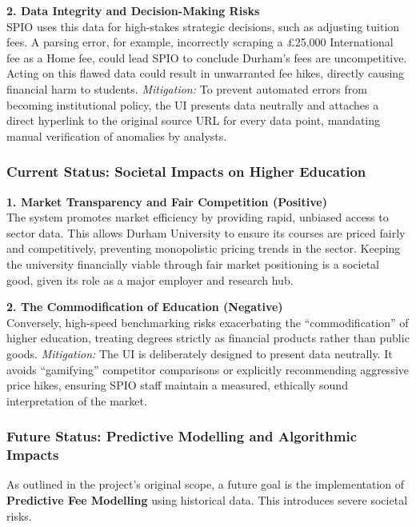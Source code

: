 \noindent \textbf{2. Data Integrity and Decision-Making Risks} \\
SPIO uses this data for high-stakes strategic decisions, such as adjusting tuition fees. A parsing error, for example, incorrectly scraping a £25,000 International fee as a Home fee, could lead SPIO to conclude Durham's fees are uncompetitive. Acting on this flawed data could result in unwarranted fee hikes, directly causing financial harm to students. 
\textit{Mitigation:} To prevent automated errors from becoming institutional policy, the UI presents data neutrally and attaches a direct hyperlink to the original source URL for every data point, mandating manual verification of anomalies by analysts.

\subsubsection{Current Status: Societal Impacts on Higher Education}

\textbf{1. Market Transparency and Fair Competition (Positive)} \\
The system promotes market efficiency by providing rapid, unbiased access to sector data. This allows Durham University to ensure its courses are priced fairly and competitively, preventing monopolistic pricing trends in the sector. Keeping the university financially viable through fair market positioning is a societal good, given its role as a major employer and research hub.

\noindent \textbf{2. The Commodification of Education (Negative)} \\
Conversely, high-speed benchmarking risks exacerbating the ``commodification'' of higher education, treating degrees strictly as financial products rather than public goods. 
\textit{Mitigation:} The UI is deliberately designed to present data neutrally. It avoids ``gamifying'' competitor comparisons or explicitly recommending aggressive price hikes, ensuring SPIO staff maintain a measured, ethically sound interpretation of the market.

\subsubsection{Future Status: Predictive Modelling and Algorithmic Impacts}

As outlined in the project's original scope, a future goal is the implementation of \textbf{Predictive Fee Modelling} using historical data. This introduces severe societal risks.

